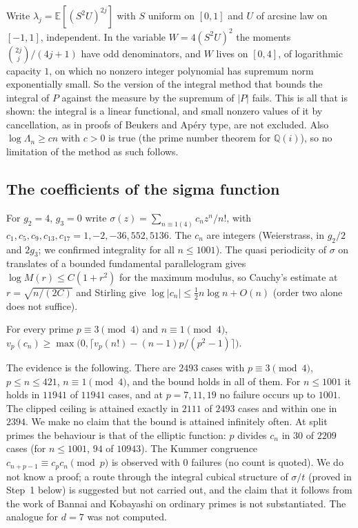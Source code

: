 \begin{remark}\label{mqg:rem:integral}
Write $\lambda_j=\mathbb E[(S^2U)^{2j}]$ with $S$ uniform on $[0,1]$ and $U$ of arcsine law on $[-1,1]$, independent. In the variable $W=4(S^2U)^2$ the moments $\binom{2j}{j}/(4j+1)$ have odd denominators, and $W$ lives on $[0,4]$, of logarithmic capacity $1$, on which no nonzero integer polynomial has supremum norm exponentially small. So the version of the integral method that bounds the integral of $P$ against the measure by the supremum of $|P|$ fails. This is all that is shown: the integral is a linear functional, and small nonzero values of it by cancellation, as in proofs of Beukers and Ap\'ery type, are not excluded. Also $\log\Lambda_n\ge cn$ with $c>0$ is true (the prime number theorem for $\mathbb Q(i)$), so no limitation of the method as such follows.
\end{remark}

\subsection{The coefficients of the sigma function}\label{mqg:sec:sigma}

For $g_2=4$, $g_3=0$ write $\sigma(z)=\sum_{n\equiv1(4)}c_nz^n/n!$, with $c_1,c_5,c_9,c_{13},c_{17}=1,-2,-36,552,5136$. The $c_n$ are integers (Weierstrass, in $g_2/2$ and $2g_3$; we confirmed integrality for all $n\le1001$). The quasi periodicity of $\sigma$ on translates of a bounded fundamental parallelogram gives $\log M(r)\le C(1+r^2)$ for the maximum modulus, so Cauchy's estimate at $r=\sqrt{n/(2C)}$ and Stirling give $\log|c_n|\le\frac12n\log n+O(n)$ (order two alone does not suffice).

\begin{conjecture}\label{mqg:conj:sigma}
For every prime $p\equiv3\pmod4$ and $n\equiv1\pmod4$, $v_p(c_n)\ge\max\bigl(0,\lceil v_p(n!)-(n-1)p/(p^2-1)\rceil\bigr)$.
\end{conjecture}

The evidence is the following. There are $2493$ cases with $p\equiv3\pmod4$, $p\le n\le421$, $n\equiv1\pmod4$, and the bound holds in all of them. For $n\le1001$ it holds in $11941$ of $11941$ cases, and at $p=7,11,19$ no failure occurs up to $1001$. The clipped ceiling is attained exactly in $2111$ of $2493$ cases and within one in $2394$. We make no claim that the bound is attained infinitely often. At split primes the behaviour is that of the elliptic function: $p$ divides $c_n$ in $30$ of $2209$ cases (for $n\le1001$, $94$ of $10943$). The Kummer congruence $c_{n+p-1}\equiv c_pc_n\pmod p$ is observed with $0$ failures (no count is quoted). We do not know a proof; a route through the integral cubical structure of $\sigma/t$ (proved in Step~1 below) is suggested but not carried out, and the claim that it follows from the work of Bannai and Kobayashi on ordinary primes is not substantiated. The analogue for $d=7$ was not computed.

